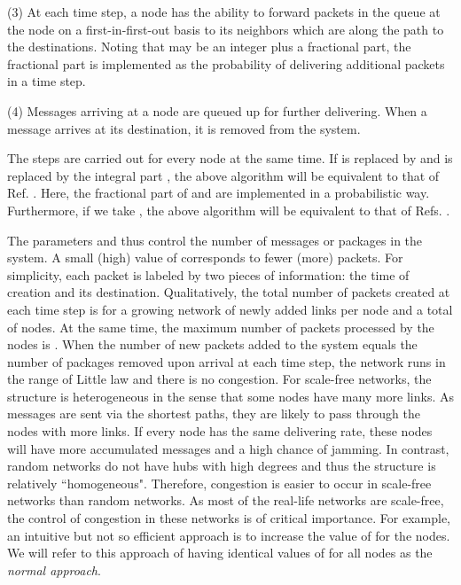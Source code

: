 \documentclass[aps,prl,twocolumn,superscriptaddress,showpacs]{revtex4}
\begin{document}
\noindent (3) At each time step, a node  has the ability to
forward  packets in the queue at the node on a
first-in-first-out basis to its neighbors which are along the path
to the destinations.  Noting that  may be an integer
plus a fractional part, the fractional part is implemented as the
probability of delivering additional packets in a time step.

\noindent (4) Messages arriving at a node are queued up for
further delivering.  When a message arrives at its destination, it
is removed from the system.

\noindent The steps are carried out for every node at the same
time. If  is replaced by  and  is
replaced by the integral part , the above
algorithm will be equivalent to that of Ref. \cite{zhao:2005}.
Here, the fractional part of  and  are
implemented in a probabilistic way.  Furthermore, if we take
, the above algorithm will be equivalent to that of Refs.
\cite{Li:1989,Leland:1993,Taqqu:1997,Crove:1997,Falout:1999,
Toru:1998,Fuks:1999,Sole:2001,Arena:2001,Guim:2001,Guim:2002,Woolf:2002,
Valv:2002,arenas1:2002,arenas2:2004,arenas3:2003,moreno1:2003,moreno2:2004,moreno3:2004}.


The parameters  and  thus control the number of
messages or packages in the system.  A small (high) value of
 corresponds to fewer (more) packets. For simplicity,
each packet is labeled by two pieces of information: the time of
creation and its destination. Qualitatively, the total number of
packets created at each time step is 
for a growing network of  newly added links per node and a
total of  nodes. At the same time, the maximum number of
packets processed by the nodes is . When the number of new packets added to
the system equals the number of packages removed upon arrival at
each time step, the network runs in the range of Little law
\cite{Allen:1990} and there is no congestion. For scale-free
networks, the structure is heterogeneous in the sense that some
nodes have many more links.  As messages are sent via the shortest
paths, they are likely to pass through the nodes with more links.
If every node has the same delivering rate, these nodes will have
more accumulated messages and a high chance of jamming. In
contrast, random networks do not have hubs with high degrees and
thus the structure is relatively ``homogeneous".  Therefore,
congestion is easier to occur in scale-free networks than random
networks.  As most of the real-life networks are scale-free, the
control of congestion in these networks is of critical importance.
For example, an intuitive but not so efficient approach is to
increase the value of  for the nodes.  We will refer to
this approach of having identical values of  for all nodes
as the {\em normal approach}.
\end{document}
